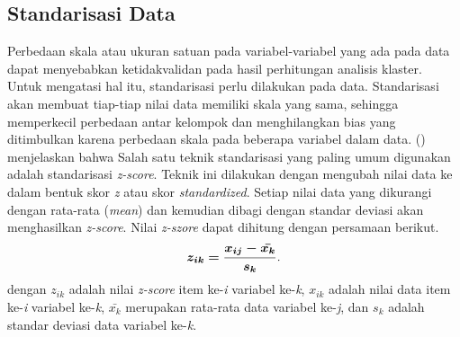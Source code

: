 \subsection{Standarisasi Data}
\par Perbedaan skala atau ukuran satuan pada variabel-variabel yang ada pada data dapat menyebabkan ketidakvalidan pada hasil perhitungan analisis klaster. Untuk mengatasi hal itu, standarisasi perlu dilakukan pada data. Standarisasi akan membuat tiap-tiap nilai data memiliki skala yang sama, sehingga memperkecil perbedaan antar kelompok dan menghilangkan bias yang ditimbulkan karena perbedaan skala pada beberapa variabel dalam data. \citeauthor{hair} (\citeyear{hair}) menjelaskan bahwa Salah satu teknik standarisasi yang paling umum digunakan adalah standarisasi \textit{z-score}. Teknik ini dilakukan dengan mengubah nilai data ke dalam bentuk skor \textit{z} atau skor \textit{standardized}. Setiap nilai data yang dikurangi dengan rata-rata (\textit{mean}) dan kemudian dibagi dengan standar deviasi akan menghasilkan \textit{z-score}. Nilai \textit{z-szore} dapat dihitung dengan persamaan berikut.
\begin{equation}
    \bm{z_{ik} = \frac{x_{ij}-\Bar{x_{k}}}{s_{k}}}.
\end{equation} 
dengan $z_{ik}$ adalah nilai \textit{z-score} item ke-\textit{i} variabel ke-\textit{k}, $x_{ik}$ adalah nilai data item ke-\textit{i} variabel ke-\textit{k}, $\bar{x_{k}}$ merupakan rata-rata data variabel ke-\textit{j}, dan $s_k$ adalah standar deviasi data variabel ke-\textit{k}.

